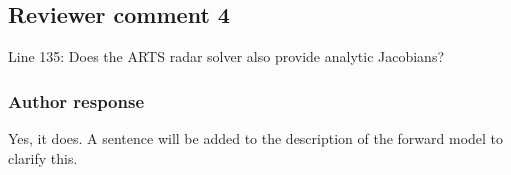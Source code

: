 \documentclass[11pt]{scrartcl}
\providecommand{\DIFadd}[1]{{\protect\textcolor{blue}{\uwave{#1}}}} %
\providecommand{\DIFdel}[1]{{\protect\textcolor{red}{\sout{#1}}}}                      %
\providecommand{\DIFaddbegin}{} %
\providecommand{\DIFaddend}{} %
\providecommand{\DIFdelbegin}{} %
\providecommand{\DIFdelend}{} %
\newenvironment{change}[1][]{%
  \begin{mdframed}[frametitle={Line #1:}]%
}{%
  \end{mdframed}%
}
\begin{document}
%

\subsection*{Reviewer comment 4}
Line 135: Does the ARTS radar solver also provide analytic Jacobians?

\subsubsection*{Author response}

Yes, it does. A sentence will be added to the description of the forward model
to clarify this.

\end{document}
